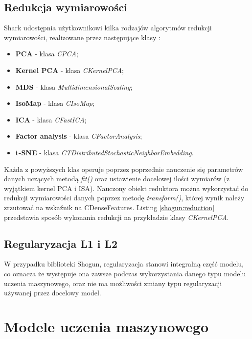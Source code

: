 \subsection{Redukcja wymiarowości}

Shark udostępnia użytkownikowi kilka rodzajów algorytmów redukcji wymiarowości, realizowane przez następujące klasy \cite{handsOnMachineLearning}:

\begin{itemize}
	\item \textbf{PCA} - klasa \textit{CPCA};
	\item \textbf{Kernel PCA} - klasa \textit{CKernelPCA};
	\item \textbf{MDS} - klasa \textit{MultidimensionalScaling};
	\item \textbf{IsoMap} - klasa \textit{CIsoMap};
	\item \textbf{ICA} - klasa \textit{CFastICA};
	\item \textbf{Factor analysis} - klasa \textit{CFactorAnalysis};
	\item \textbf{t-SNE} - klasa \textit{CTDistributedStochasticNeighborEmbedding}.
\end{itemize}

Każda z powyższych klas operuje poprzez poprzednie nauczenie się parametrów danych uczących metodą \textit{fit()} oraz ustawienie docelowej ilości wymiarów (z wyjątkiem kernel PCA i ISA). Nauczony obiekt reduktora można wykorzystać do redukcji wymiarowości danych poprzez metodę \textit{transform()}, której wynik należy zrzutować na wskaźnik na CDenseFeatures. Listing \ref{shogun:reduction} przedstawia sposób wykonania redukcji na przykładzie klasy \textit{CKernelPCA}.


\subsection{Regularyzacja L1 i L2}

W przypadku biblioteki Shogun, regularyzacja stanowi integralną część modelu, co oznacza że występuje ona zawsze podczas wykorzystania danego typu modelu uczenia maszynowego, oraz nie ma możliwości zmiany typu regularyzacji używanej przez docelowy model.

\section{Modele uczenia maszynowego}
